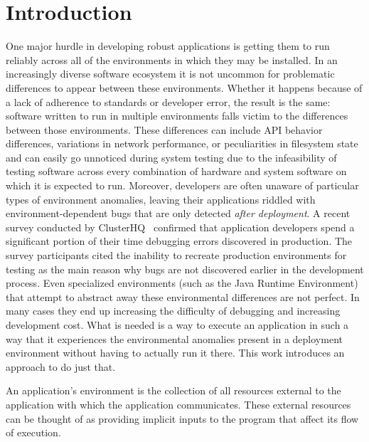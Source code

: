 \section{Introduction}

One major hurdle in developing robust applications is getting them to
run reliably across all of the environments in which they may be
installed.  In an increasingly diverse software ecosystem it is not
uncommon for problematic differences to appear between these
environments.  Whether it happens because of a lack of adherence to
standards or developer error, the result is the same: software written
to run in multiple environments falls victim to the differences
between those environments.  These differences can include API behavior
differences, variations in network performance, or peculiarities in
filesystem state and
can easily go unnoticed
during system testing due to the infeasibility of testing software
across every combination of hardware and system software on which it
is expected to run. Moreover, developers are often unaware
of particular types of environment anomalies, leaving their
applications riddled with environment-dependent bugs that are only
detected \emph{after deployment}. A recent survey conducted by
ClusterHQ~\cite{ClusterHQSurvey} confirmed that application developers
spend a significant portion of their time debugging errors discovered
in production.  The survey participants cited the inability to
recreate production environments for testing as the main reason why
bugs are not discovered earlier in the development process.
Even specialized environments (such as the Java Runtime Environment) that
attempt to abstract away these environmental differences are not perfect.
In many cases they end up increasing the difficulty of debugging and
increasing development cost.
What is needed is a way to execute an application in such a way that
it experiences the environmental anomalies present in a deployment
environment without having to actually run it there.  This work
introduces an approach to do just that.

An application's environment is the collection of all resources
external to the application with which the application communicates.
These external resources can be thought of as providing implicit
inputs to the program that affect its flow of execution.

